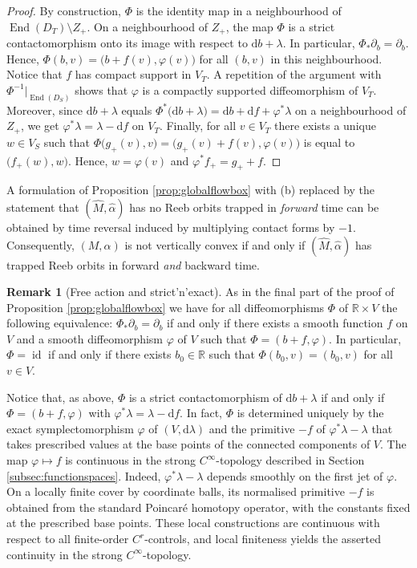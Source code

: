 \documentclass{amsart}
\theoremstyle{definition}
\newtheorem{rem}[prop]{Remark}
\newcommand{\rmd}{\mathrm d}
\newcommand{\R}{\mathbb R}
\DeclareMathOperator{\End}{\mathrm{End}}
\DeclareMathOperator{\id}{\mathrm{id}}
\begin{document}
\begin{proof}
  By construction,
  $\Phi$ is the identity map
  in a neighbourhood of $\End(D_T)\setminus Z_+$.
  On a neighbourhood of $Z_+$,
  the map $\Phi$ is a strict contactomorphism
  onto its image with respect to $\rmd b+\lambda$.
  In particular, $\Phi_*\partial_b=\partial_b$.
  Hence,
  $\Phi(b,v)=\big(b+f(v),\varphi(v)\big)$
  for all $(b,v)$ in this neighbourhood.
  Notice that $f$ has compact support in $V_T$.
  A repetition of the argument with $\Phi^{-1}|_{\End(D_S)}$
  shows that $\varphi$ is a compactly supported
  diffeomorphism of $V_T$.
  Moreover, since $\rmd b+\lambda$ equals
  $\Phi^*\big(\rmd b+\lambda\big)=\rmd b+\rmd f+\varphi^*\lambda$
  on a neighbourhood of $Z_+$,
  we get $\varphi^*\lambda=\lambda-\rmd f$ on $V_T$.
  Finally,
  for all $v\in V_T$ there exists a unique $w\in V_S$
  such that $\Phi\big(g_+(v),v\big)=\big(g_+(v)+f(v),\varphi(v)\big)$
  is equal to $\big(f_+(w),w\big)$.
  Hence,
  $w=\varphi(v)$ and $\varphi^*f_+=g_++f$.
\end{proof}


A formulation of Proposition \ref{prop:globalflowbox}
with (b) replaced by the statement
that $(\hat{M},\hat{\alpha})$ has no Reeb orbits
trapped in {\it forward} time
can be obtained by time reversal
induced by multiplying contact forms by $-1$.
Consequently,
$(M,\alpha)$ is not vertically convex
if and only if 
$(\hat{M},\hat{\alpha})$ has trapped Reeb orbits
in forward {\it and} backward time.


\begin{rem}[Free action and strict'n'exact]
\label{rem:freeactionstrnex}
  As in the final part of the proof of Proposition \ref{prop:globalflowbox}
  we have for all diffeomorphisms $\Phi$ of $\R\times V$
  the following equivalence:
  $\Phi_*\partial_b=\partial_b$ if and only if
  there exists a smooth function $f$ on $V$ and
  a smooth diffeomorphism $\varphi$ of $V$ such that
  $\Phi=(b+f,\varphi)$.
  In particular,
  $\Phi=\id$ if and only if there exists $b_0\in\R$
  such that $\Phi(b_0,v)=(b_0,v)$ for all $v\in V$.
  
  Notice that, as above,
  $\Phi$ is a strict contactomorphism of $\rmd b+\lambda$
  if and only if
  $\Phi=(b+f,\varphi)$ with $\varphi^*\lambda=\lambda-\rmd f$.
  In fact, $\Phi$ is determined uniquely
  by the exact symplectomorphism $\varphi$ of $(V,\rmd\lambda)$
  and the primitive $-f$ of $\varphi^*\lambda-\lambda$
  that takes prescribed values at the base points
  of the connected components of $V$.
The map $\varphi\mapsto f$ is continuous
in the strong $C^{\infty}$-topology described in
Section \ref{subsec:functionspaces}.
Indeed, $\varphi^*\lambda-\lambda$
depends smoothly on the first jet of $\varphi$.
On a locally finite cover by coordinate balls,
its normalised primitive $-f$ is obtained from
the standard Poincar\'e homotopy operator,
with the constants fixed at the prescribed base points.
These local constructions are continuous
with respect to all finite-order $C^r$-controls,
and local finiteness yields the asserted continuity
in the strong $C^{\infty}$-topology.
\end{rem}
\end{document}

